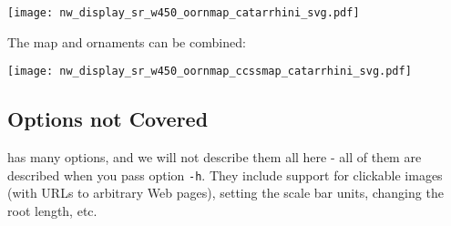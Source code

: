 \begin{quote}
 
\end{quote}



\begin{center}
 \texttt{[image: nw\_display\_sr\_w450\_oornmap\_catarrhini\_svg.pdf]}
\end{center}

\noindent{}The \css{} map and ornaments can be combined:



\begin{center}
 \texttt{[image: nw\_display\_sr\_w450\_oornmap\_ccssmap\_catarrhini\_svg.pdf]}
\end{center}

\subsection{Options not Covered}

\display{} has many options, and we will not describe them all here - all of
them are described when you pass option \texttt{-h}. They include support for
clickable images (with URLs to arbitrary Web pages), setting the scale bar
units, changing the root length, etc. 
